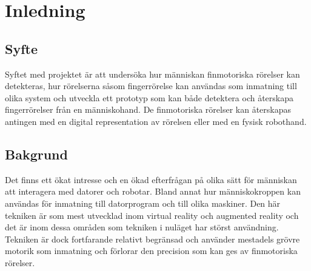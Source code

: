 \documentclass[a4paper]{article}
\begin{document}




\begin{abstract}

\end{abstract}

\begin{otherlanguage}{english}
    \begin{abstract}
    \end{abstract}
\end{otherlanguage}

\tableofcontents

\newpage
{}

\begin{sloppypar}

    \section{Inledning}
    \subsection{Syfte}
    Syftet med projektet är att undersöka hur människan finmotoriska rörelser kan detekteras, hur rörelserna såsom fingerrörelse kan användas som inmatning till olika system
    och utveckla ett prototyp som kan både detektera och återskapa fingerrörelser från en människohand.
    De finmotoriska rörelser kan återskapas antingen med en digital representation av rörelsen eller med en fysisk robothand.
    \subsection{Bakgrund}
    Det finns ett ökat intresse och en ökad efterfrågan på olika sätt för människan att interagera med datorer och robotar.
    Bland annat hur människokroppen kan användas för inmatning till datorprogram och till olika maskiner.
    Den här tekniken är som mest utvecklad inom virtual reality och augmented reality och det är inom dessa områden som tekniken i nuläget har störst användning.
    Tekniken är dock fortfarande relativt begränsad och använder mestadels grövre motorik som inmatning och förlorar den precision som kan ges av finmotoriska rörelser.



\end{sloppypar}
\end{document}
